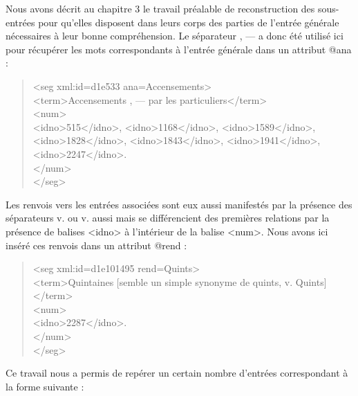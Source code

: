 \documentclass[a4paper,12pt,twoside]{book}
\begin{document}
	\noindent Nous avons décrit au chapitre 3 le travail préalable de reconstruction des sous-entrées pour qu'elles disposent dans leurs corps des parties de l'entrée générale nécessaires à leur bonne compréhension. Le séparateur \og{} , — \fg{} a donc été utilisé ici pour récupérer les mots correspondants à l'entrée générale dans un attribut @ana :
	
	\begin{quotation}
		<seg xml:id=\textquotesingle d1e533\textquotesingle{} ana=\textquotesingle Accensements\textquotesingle >\\
		\indent{}Accensements , — par les particuliers</term>\\
		\indent\indent<num>\\
		\indent\indent{}515</idno>, <idno>1168</idno>, <idno>1589</idno>,\\ 
		\indent\indent{}1828</idno>,
		<idno>1843</idno>, <idno>1941</idno>, \\
		\indent\indent{}2247</idno>.\\
		\indent{}\\
	\end{quotation}
	
	\noindent Les renvois vers les entrées associées sont eux aussi manifestés par la présence des séparateurs \og v.\fg{} ou \og v. aussi\fg{} mais se différencient des premières relations par la présence de balises <idno> à l'intérieur de la balise <num>. Nous avons ici inséré ces renvois dans un attribut @rend :
	
	\begin{quotation}
			<seg xml:id=\textquotesingle d1e101495\textquotesingle{} rend=\textquotesingle Quints\textquotesingle >\\
			\indent\indent<term>Quintaines [semble un simple synonyme de quints, v. Quints]</term>\\
			\indent\indent<num>\\
			\indent\indent\indent<idno>2287</idno>.\\
			\indent\indent</num>\\
			\indent</seg>\\
	\end{quotation}
	
	\noindent Ce travail nous a permis de repérer un certain nombre d'entrées correspondant à la forme suivante :
	
\end{document}
